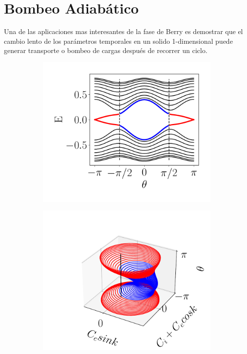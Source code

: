 \section{Bombeo Adiabático}

Una de las aplicaciones mas interesantes de la fase de Berry es demostrar que el cambio lento de los parámetros temporales en un solido 1-dimensional puede generar transporte o bombeo de cargas después de recorrer un ciclo.


\begin{figure}[tbh!]
     \centering
    \captionsetup[sub]{font=small}

     \begin{subfigure}[b!]{0.25 \textwidth}
         \caption{}
         \includegraphics[width=\textwidth]{Imagenes/Shh_images/bands_shh_pump.pdf}
     \end{subfigure}\hspace*{-0.9em}
     \begin{subfigure}[b!]{0.25 \textwidth}
         \caption{}
         \includegraphics[width=\textwidth]{Imagenes/Shh_images/loop_pump_ssh.pdf}

\end{subfigure}
\end{figure}
